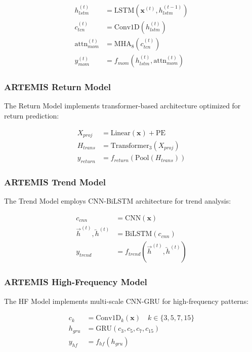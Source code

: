 \documentclass[10pt,twocolumn]{article}
\begin{document}
\begin{align}
h_{lstm}^{(t)} &= \text{LSTM}(\mathbf{x}^{(t)}, h_{lstm}^{(t-1)}) \\
c_{tcn}^{(t)} &= \text{Conv1D}(h_{lstm}^{(t)}) \\
\text{attn}_{mom}^{(t)} &= \text{MHA}_8(c_{tcn}^{(t)}) \\
y_{mom}^{(t)} &= f_{mom}(h_{lstm}^{(t)}, \text{attn}_{mom}^{(t)})
\end{align}

\subsubsection{ARTEMIS Return Model}

The Return Model implements transformer-based architecture optimized for return prediction:

\begin{align}
X_{proj} &= \text{Linear}(\mathbf{x}) + \text{PE} \\
H_{trans} &= \text{Transformer}_3(X_{proj}) \\
y_{return} &= f_{return}(\text{Pool}(H_{trans}))
\end{align}

\subsubsection{ARTEMIS Trend Model}

The Trend Model employs CNN-BiLSTM architecture for trend analysis:

\begin{align}
c_{cnn} &= \text{CNN}(\mathbf{x}) \\
\vec{h}^{(t)}, \overleftarrow{h}^{(t)} &= \text{BiLSTM}(c_{cnn}) \\
y_{trend} &= f_{trend}(\vec{h}^{(t)}, \overleftarrow{h}^{(t)})
\end{align}

\subsubsection{ARTEMIS High-Frequency Model}

The HF Model implements multi-scale CNN-GRU for high-frequency patterns:

\begin{align}
c_k &= \text{Conv1D}_k(\mathbf{x}) \quad k \in \{3,5,7,15\} \\
h_{gru} &= \text{GRU}(c_3, c_5, c_7, c_{15}) \\
y_{hf} &= f_{hf}(h_{gru})
\end{align}
\end{document}
